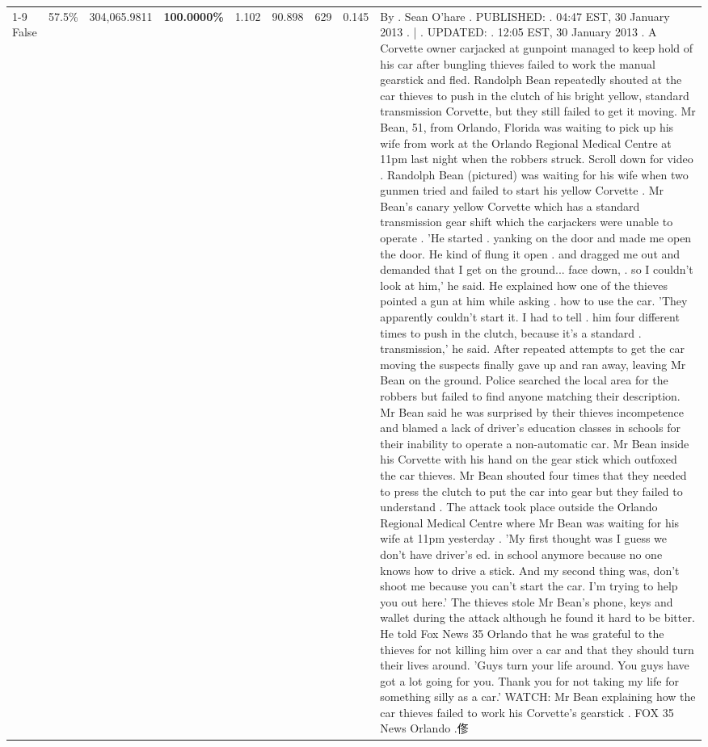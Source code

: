 \begin{table}[H]
\begin{tabular}{lllrlllll}
\cline{1-9} \cline{2-9}
False & 57.5\% & 304,065.9811 & \bfseries \color{red} 100.0000\% & 1.102 & 90.898 & 629 & 0.145 & By . Sean O'hare . PUBLISHED: . 04:47 EST, 30 January 2013 . | . UPDATED: . 12:05 EST, 30 January 2013 . A Corvette owner carjacked at gunpoint managed to keep hold of his car after bungling thieves failed to work the manual gearstick and fled. Randolph Bean repeatedly shouted at the car thieves to push in the clutch of his bright yellow, standard transmission Corvette, but they still failed to get it moving. Mr Bean, 51, from Orlando, Florida was waiting to pick up his wife from work at the Orlando Regional Medical Centre at 11pm last night when the robbers struck. Scroll down for video . Randolph Bean (pictured) was waiting for his wife when two gunmen tried and failed to start his yellow Corvette . Mr Bean's canary yellow Corvette which has a standard transmission gear shift which the carjackers were unable to operate . 'He started . yanking on the door and made me open the door. He kind of flung it open . and dragged me out and demanded that I get on the ground... face down, . so I couldn't look at him,' he said. He explained how one of the thieves pointed a gun at him while asking . how to use the car. 'They apparently couldn't start it. I had to tell . him four different times to push in the clutch, because it's a standard . transmission,' he said. After repeated attempts to get the car moving the suspects finally gave up and ran away, leaving Mr Bean on the ground. Police searched the local area for the robbers but failed to find anyone matching their description. Mr Bean said he was surprised by their thieves incompetence and blamed a lack of driver's education classes in schools for their inability to operate a non-automatic car. Mr Bean inside his Corvette with his hand on the gear stick which outfoxed the car thieves. Mr Bean shouted four times that they needed to press the clutch to put the car into gear but they failed to understand . The attack took place outside the Orlando Regional Medical Centre where Mr Bean was waiting for his wife at 11pm yesterday . 'My first thought was I guess we don't have driver's ed. in school anymore because no one knows how to drive a stick. And my second thing was, don't shoot me because you can't start the car. I'm trying to help you out here.' The thieves stole Mr Bean's phone, keys and wallet during the attack although he found it hard to be bitter. He told Fox News 35 Orlando that he was grateful to the thieves for not killing him over a car and that they should turn their lives around. 'Guys turn your life around. You guys have got a lot going for you. Thank you for not taking my life for something silly as a car.' WATCH: Mr Bean explaining how the car thieves failed to work his Corvette's gearstick . FOX 35 News Orlando .俢 \\

\end{tabular}
\end{table}
